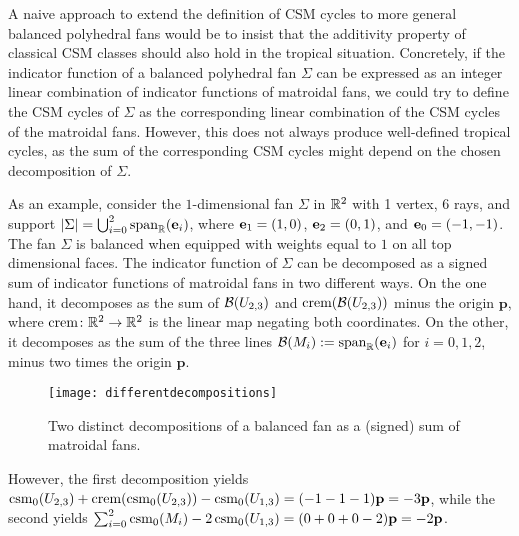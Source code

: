  
\begin{exa}
A naive approach to extend the definition of CSM cycles to more general balanced polyhedral fans would be to insist that the additivity property of classical 
CSM classes should also hold in the tropical situation.
Concretely, if the indicator function of a balanced polyhedral fan $\Sigma$ can be expressed as an integer linear combination of indicator functions of matroidal fans, we could try to define the CSM cycles of $\Sigma$ as the corresponding linear combination of the CSM cycles of the matroidal fans. 
However, this does not always produce well-defined tropical cycles, as the sum of the corresponding CSM cycles might depend on the chosen decomposition of $\Sigma$.

As an example, consider the $1$-dimensional fan $\Sigma$ in $\mathbb{R}^2$ with 1 vertex, 6 rays, and support $|\Sigma|=\bigcup_{i=0}^2\operatorname{span}_{\mathbb{R}}(\mathbf e_i)$, 
where $\mathbf e_1=(1,0)$, $\mathbf e_2=(0,1)$, and $\mathbf e_0=(-1,-1)$.
The fan $\Sigma$ is balanced when equipped with weights equal to $1$ on all top dimensional faces.  
The indicator function of $\Sigma$ can be decomposed as a signed sum of indicator functions of matroidal fans in two different ways. 
On the one hand, it decomposes as the sum of ${\mathcal B}(U_{2, 3})$ and $\text{crem}({\mathcal B}(U_{2, 3}))$ minus the origin $\mathbf{p}$, where $\text{crem} \colon \mathbb{R}^2 \to \mathbb{R}^2$ is the linear map negating both coordinates. 
On the other, it decomposes as the sum of the three lines ${\mathcal B}(M_i) := \operatorname{span}_{\mathbb{R}}(\mathbf e _i)$
for $i = 0, 1, 2$, minus two times the origin $\mathbf{p}$. 
\begin{figure}[ht]
\begin{center}
\texttt{[image: differentdecompositions]}
\caption{Two distinct decompositions of a balanced fan as a (signed) sum of matroidal fans.}
\label{figdecompositions}
\end{center}
\end{figure}
However, the first decomposition yields $\operatorname{csm}_0(U_{2, 3}) + \text{crem}(\operatorname{csm}_0(U_{2, 3})) - \operatorname{csm}_0(U_{1,3}) = (-1-1-1) \mathbf{p} = -3 \mathbf{p}$,
while the second yields $\sum_{i=0}^2 \operatorname{csm}_0(M_i) - 2 \operatorname{csm}_0(U_{1,3}) = (0 + 0 + 0 - 2)\mathbf{p} = -2 \mathbf{p}$.
\end{exa}